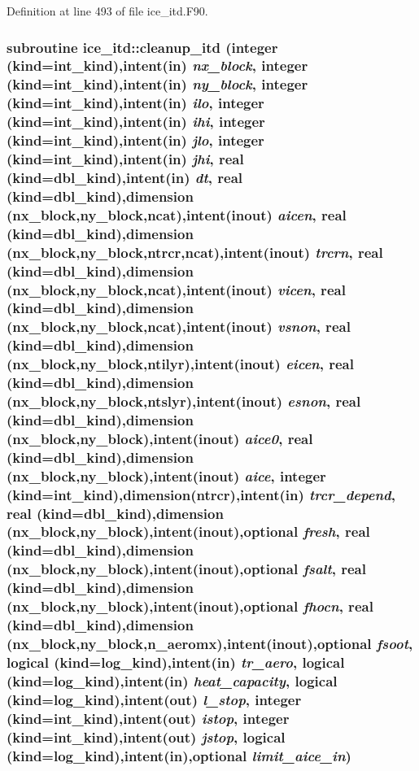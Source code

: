 Definition at line 493 of file ice\_\-itd.F90.\hypertarget{namespaceice__itd_a3e9112301701b3265ffbd9273598a98d}{
\subsubsection[{cleanup\_\-itd}]{\setlength{\rightskip}{0pt plus 5cm}subroutine ice\_\-itd::cleanup\_\-itd (integer (kind=int\_\-kind),intent(in) {\em nx\_\-block}, \/  integer (kind=int\_\-kind),intent(in) {\em ny\_\-block}, \/  integer (kind=int\_\-kind),intent(in) {\em ilo}, \/  integer (kind=int\_\-kind),intent(in) {\em ihi}, \/  integer (kind=int\_\-kind),intent(in) {\em jlo}, \/  integer (kind=int\_\-kind),intent(in) {\em jhi}, \/  real (kind=dbl\_\-kind),intent(in) {\em dt}, \/  real (kind=dbl\_\-kind),dimension (nx\_\-block,ny\_\-block,ncat),intent(inout) {\em aicen}, \/  real (kind=dbl\_\-kind),dimension (nx\_\-block,ny\_\-block,ntrcr,ncat),intent(inout) {\em trcrn}, \/  real (kind=dbl\_\-kind),dimension (nx\_\-block,ny\_\-block,ncat),intent(inout) {\em vicen}, \/  real (kind=dbl\_\-kind),dimension (nx\_\-block,ny\_\-block,ncat),intent(inout) {\em vsnon}, \/  real (kind=dbl\_\-kind),dimension (nx\_\-block,ny\_\-block,ntilyr),intent(inout) {\em eicen}, \/  real (kind=dbl\_\-kind),dimension (nx\_\-block,ny\_\-block,ntslyr),intent(inout) {\em esnon}, \/  real (kind=dbl\_\-kind),dimension (nx\_\-block,ny\_\-block),intent(inout) {\em aice0}, \/  real (kind=dbl\_\-kind),dimension (nx\_\-block,ny\_\-block),intent(inout) {\em aice}, \/  integer (kind=int\_\-kind),dimension(ntrcr),intent(in) {\em trcr\_\-depend}, \/  real (kind=dbl\_\-kind),dimension (nx\_\-block,ny\_\-block),intent(inout),optional {\em fresh}, \/  real (kind=dbl\_\-kind),dimension (nx\_\-block,ny\_\-block),intent(inout),optional {\em fsalt}, \/  real (kind=dbl\_\-kind),dimension (nx\_\-block,ny\_\-block),intent(inout),optional {\em fhocn}, \/  real (kind=dbl\_\-kind),dimension (nx\_\-block,ny\_\-block,n\_\-aeromx),intent(inout),optional {\em fsoot}, \/  logical (kind=log\_\-kind),intent(in) {\em tr\_\-aero}, \/  logical (kind=log\_\-kind),intent(in) {\em heat\_\-capacity}, \/  logical (kind=log\_\-kind),intent(out) {\em l\_\-stop}, \/  integer (kind=int\_\-kind),intent(out) {\em istop}, \/  integer (kind=int\_\-kind),intent(out) {\em jstop}, \/  logical (kind=log\_\-kind),intent(in),optional {\em limit\_\-aice\_\-in})}}
\label{namespaceice__itd_a3e9112301701b3265ffbd9273598a98d}


